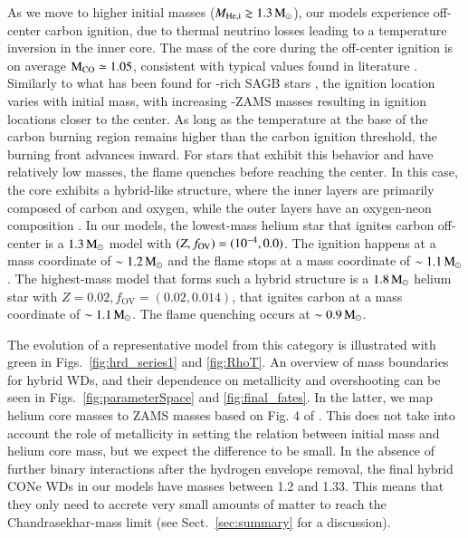 \documentclass[main.tex]{subfiles}
\begin{document}
As we move to higher initial masses ($M_{\rm{He, i}}\gtrsim 1.3\mathrm{\,M_\odot}$), our models experience off-center carbon ignition, due to thermal neutrino losses leading to a temperature inversion in the inner core. The mass of the core during the off-center ignition is on average $\rm M_{CO} \simeq 1.05$\msun, consistent  with  typical values found in literature \citep[e.g.,][]{doherty2015}. Similarly to what has been found for -rich SAGB stars \citep[e.g.,][]{Garcia1997,Gil-Pons:2003sep,siess2006,Poelarends:2007ip,Doherty:2010slg,Farmer:2015afs}, the ignition location 
varies with initial mass, with increasing -ZAMS masses resulting in ignition locations closer to the center. 
As long as the temperature at the base of the carbon burning region remains higher than the carbon ignition threshold, the 
burning front advances inward.  For stars that exhibit this behavior and have relatively low masses, the flame quenches before reaching the center.
In this case, the core exhibits a hybrid-like structure, where the inner layers are primarily composed of carbon and oxygen, while the outer layers have an oxygen-neon composition \citep[for a detailed discussion on the flame quenching mechanisms we refer to the work of][]{Siess2009, Denissenkov:2013qaa, chen2014b, Farmer:2015afs}. 
In our \seriesone models, the lowest-mass helium star that ignites carbon off-center is a $1.3\mathrm{\,M_\odot}$ model with $(Z,f_{\rm OV})=(10^{-4},0.0)$. The ignition happens at a mass coordinate of $\sim 1.2\mathrm{\,M_\odot}$ and the flame stops at a mass coordinate of $\sim 1.1\mathrm{\,M_\odot}$. The highest-mass model that forms such a hybrid structure is a $1.8\mathrm{\,M_\odot}$ helium star with $Z=0.02,f_{\text{OV}} = (0.02,0.014)$, that ignites carbon at a  mass coordinate of $\sim 1.1\mathrm{\,M_\odot}$. The flame quenching occurs at $\sim 0.9\mathrm{\,M_\odot}$. 

The evolution of a representative model from this category is illustrated with green in Figs.~\ref{fig:hrd_series1} and \ref{fig:RhoT}. An overview of mass boundaries for hybrid WDs, and their dependence on metallicity and overshooting can be seen in Figs.~\ref{fig:parameterSpace} and \ref{fig:final_fates}. 
In the latter, we map helium core masses to ZAMS masses based on Fig. 4 of \cite{Farmer:2015afs}. This does not take into account the role of metallicity in setting the relation between initial mass and helium core mass, but we expect the difference to be small. In the absence of further binary interactions after the hydrogen envelope removal, the final hybrid CONe WDs in our models have masses between 1.2 and 1.33\msun. This means that they only need to accrete very small amounts of matter to reach the Chandrasekhar-mass limit (see Sect.~\ref{sec:summary} for a discussion). 
\end{document}
